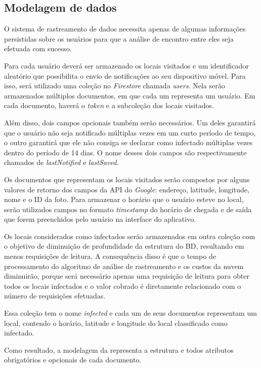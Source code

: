 \subsection{Modelagem de dados}\label{sec:modelagemdedados}
O sistema de rastreamento de dados necessita apenas de algumas informações persistidas sobre os usuários para que a análise de encontro entre eles seja efetuada com sucesso. 

Para cada usuário deverá ser armazenado os locais visitados e um identificador aleatório que possibilita o envio de notificações ao seu dispositivo móvel. Para isso, será utilizado uma coleção no \textit{Firestore} chamada \textit{users}. Nela serão armazenados múltiplos documentos, em que cada um representa um usuário. Em cada documento, haverá o \textit{token} e a subcoleção dos locais visitados.

Além disso, dois campos opcionais também serão necessários. Um deles garantirá que o usuário não seja notificado múltiplas vezes em um curto período de tempo, o outro garantirá que ele não consiga se declarar como infectado múltiplas vezes dentro do período de 14 dias. O nome desses dois campos são respectivamente chamados de \textit{lastNotified} e \textit{lastSaved}.

Os documentos que representam os locais visitados serão compostos por alguns valores de retorno dos campos da API do \textit{Google}: endereço, latitude, longitude, nome e o ID da foto. Para armazenar o horário que o usuário esteve no local, serão utilizados campos no formato \textit{timestamp} do horário de chegada e de saída que forem preenchidos pelo usuário na interface do aplicativo.

Os locais considerados como infectados serão armazenados em outra coleção com o objetivo de diminuição de profundidade da estrutura do BD, resultando em menos requisições de leitura. A consequência disso é que o tempo de processamento do algoritmo de análise de rastreamento e os custos da nuvem diminuirão, porque será necessário apenas uma requisição de leitura para obter todos os locais infectados e o valor cobrado é diretamente relacionado com o número de requisições efetuadas.

Essa coleção tem o nome \textit{infected} e cada um de seus documentos representam um local, contendo o horário, latitude e longitude do local classificado como infectado.

Como resultado, a modelagem da  representa a estrutura e todos atributos obrigatórios e opcionais de cada documento.


